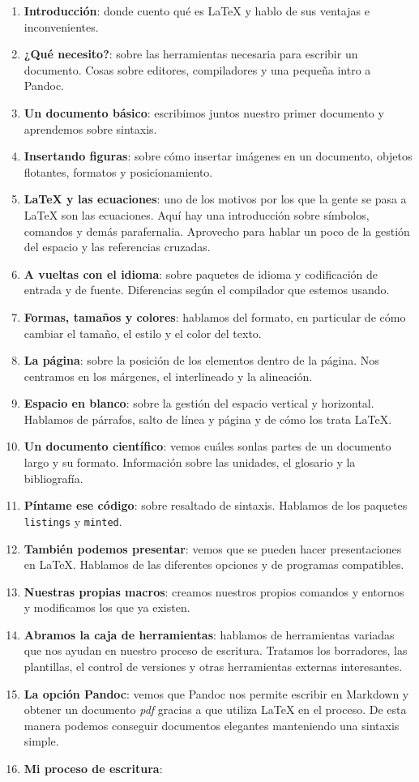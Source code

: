 \begin{enumerate}
\item
  \textbf{Introducción}: donde cuento qué es LaTeX y hablo de sus
  ventajas e inconvenientes.
\item
  \textbf{¿Qué necesito?}: sobre las herramientas necesaria para
  escribir un documento. Cosas sobre editores, compiladores y una
  pequeña intro a Pandoc.
\item
  \textbf{Un documento básico}: escribimos juntos nuestro primer
  documento y aprendemos sobre sintaxis.
\item
  \textbf{Insertando figuras}: sobre cómo insertar imágenes en un
  documento, objetos flotantes, formatos y posicionamiento.
\item
  \textbf{LaTeX y las ecuaciones}: uno de los motivos por los que la
  gente se pasa a LaTeX son las ecuaciones. Aquí hay una introducción
  sobre símbolos, comandos y demás parafernalia. Aprovecho para hablar
  un poco de la gestión del espacio y las referencias cruzadas.
\item
  \textbf{A vueltas con el idioma}: sobre paquetes de idioma y
  codificación de entrada y de fuente. Diferencias según el compilador
  que estemos usando.
\item
  \textbf{Formas, tamaños y colores}: hablamos del formato, en
  particular de cómo cambiar el tamaño, el estilo y el color del texto.
\item
  \textbf{La página}: sobre la posición de los elementos dentro de la
  página. Nos centramos en los márgenes, el interlineado y la
  alineación.
\item
  \textbf{Espacio en blanco}: sobre la gestión del espacio vertical y
  horizontal. Hablamos de párrafos, salto de línea y página y de cómo
  los trata LaTeX.
\item
  \textbf{Un documento científico}: vemos cuáles sonlas partes de un
  documento largo y su formato. Información sobre las unidades, el
  glosario y la bibliografía.
\item
  \textbf{Píntame ese código}: sobre resaltado de sintaxis. Hablamos de
  los paquetes \texttt{listings} y \texttt{minted}.
\item
  \textbf{También podemos presentar}: vemos que se pueden hacer
  presentaciones en LaTeX. Hablamos de las diferentes opciones y de
  programas compatibles.
\item
  \textbf{Nuestras propias macros}: creamos nuestros propios comandos y
  entornos y modificamos los que ya existen.
\item
  \textbf{Abramos la caja de herramientas}: hablamos de herramientas
  variadas que nos ayudan en nuestro proceso de escritura. Tratamos los
  borradores, las plantillas, el control de versiones y otras
  herramientas externas interesantes.
\item 
  \textbf{La opción Pandoc}: vemos que Pandoc nos permite escribir en
  Markdown y obtener un documento \emph{pdf} gracias a que utiliza LaTeX
  en el proceso. De esta manera podemos conseguir documentos
  elegantes manteniendo una sintaxis simple.
\item
  \textbf{Mi proceso de escritura}:
\end{enumerate}


